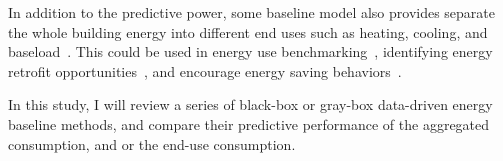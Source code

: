 \documentclass[12pt]{article}
\begin{document}
In addition to the predictive power, some baseline model also provides
separate the whole building energy into different end uses such as
heating, cooling, and baseload~\cite{fels1986prism, leanEng,
  firstViewUnder2016, wytock2013contextually}. This could be used in
energy use benchmarking~\cite{leanEng}, identifying energy retrofit
opportunities~\cite{leanEng, wytock2013contextually}, and encourage
energy saving behaviors~\cite{wytock2013contextually}.

In this study, I will review a series of black-box or gray-box
data-driven energy baseline methods, and compare their predictive
performance of the aggregated consumption, and or the end-use
consumption.




\end{document}
